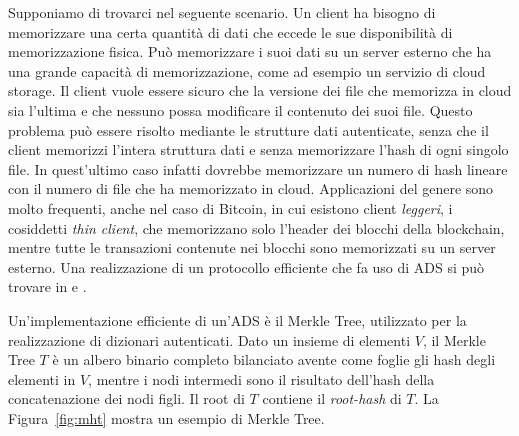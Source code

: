 Supponiamo di trovarci nel seguente scenario. Un client ha bisogno di memorizzare una certa quantità di dati che eccede le sue disponibilità di memorizzazione fisica. Può memorizzare i suoi dati su un server esterno che ha una grande capacità di memorizzazione, come ad esempio un servizio di cloud storage. Il client vuole essere sicuro che la versione dei file che memorizza in cloud sia l'ultima e che nessuno possa modificare il contenuto dei suoi file. Questo problema può essere risolto mediante le strutture dati autenticate, senza che il client memorizzi l'intera struttura dati e senza memorizzare l'hash di ogni singolo file. In quest'ultimo caso infatti dovrebbe memorizzare un numero di hash lineare con il numero di file che ha memorizzato in cloud. Applicazioni del genere sono molto frequenti, anche nel caso di Bitcoin, in cui esistono client \emph{leggeri}, i cosiddetti \emph{thin client}, che memorizzano solo l'header dei blocchi della blockchain, mentre tutte le transazioni contenute nei blocchi sono memorizzati su un server esterno. Una realizzazione di un protocollo efficiente che fa uso di ADS si può trovare in \cite{pennino2019pipeline} e \cite{gdm}.

Un'implementazione efficiente di un'ADS è il Merkle Tree, utilizzato per la realizzazione di dizionari autenticati. Dato un insieme di elementi $V$, il Merkle Tree $T$ è un albero binario completo bilanciato avente come foglie gli hash degli elementi in $V$, mentre i nodi intermedi sono il risultato dell'hash della concatenazione dei nodi figli. Il root di $T$ contiene il \emph{root-hash} di $T$. La Figura~\ref{fig:mht} mostra un esempio di Merkle Tree.

